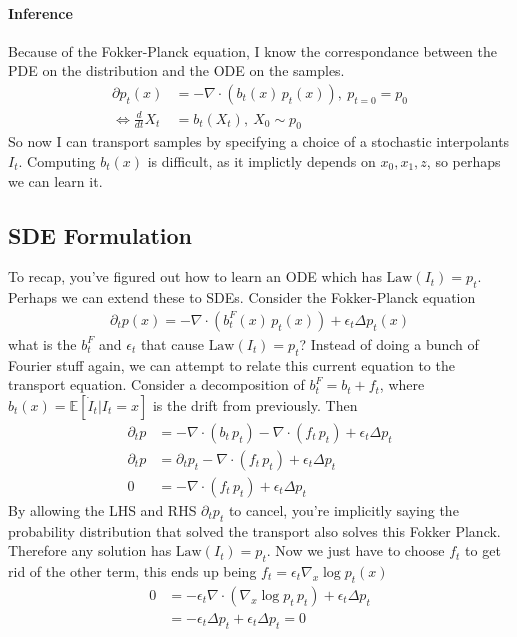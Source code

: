 \paragraph{Inference}
Because of the Fokker-Planck equation, I know the correspondance between the PDE on the distribution and the ODE on the samples.
\begin{align}
	\partial p_t (x) & = - \nabla \cdot (b_t(x) \, p_t(x)),  \ p_{t=0} = p_0\\
	\iff \frac{d}{dt}X_t & = b_t(X_t), \ X_0 \sim p_0 \label{ode}
\end{align} 
So now I can transport samples by specifying a choice of a stochastic interpolants $I_t$. Computing $b_t(x)$ is difficult, as it implictly depends on $x_0,x_1,z$, so perhaps we can learn it.

\subsection{SDE Formulation}
To recap, you've figured out how to learn an ODE which has $\text{Law}(I_t) = p_t$. Perhaps we can extend these to SDEs. Consider the Fokker-Planck equation
\begin{align}
	\partial_t p(x) = - \nabla \cdot (b^F_t(x) \, p_t(x)) + \epsilon_t \Delta p_t(x)
\end{align}
what is the $b_t^F$ and $\epsilon_t$ that cause $\text{Law}(I_t) = p_t$? Instead of doing a bunch of Fourier stuff again, we can attempt to relate this current equation to the transport equation. Consider a decomposition of $b_t^F = b_t + f_t$, where $b_t(x) = \mathbb E[\dot I_t | I_t = x]$ is the drift from previously. Then
\begin{align}
	\partial_t p & = - \nabla \cdot (b_t \, p_t)  - \nabla \cdot (f_t \, p_t) + \epsilon_t \Delta p_t\\
	\partial_t p & = \partial_t p_t - \nabla \cdot (f_t \, p_t) + \epsilon_t \Delta p_t\\
	0 & = - \nabla \cdot (f_t \, p_t) + \epsilon_t \Delta p_t
\end{align}
By allowing the LHS and RHS $\partial_t p_t$ to cancel, you're implicitly saying the probability distribution that solved the transport also solves this Fokker Planck. Therefore any solution has $\text{Law}(I_t) = p_t$. Now we just have to choose $f_t$ to get rid of the other term, this ends up being $f_t = \epsilon_t \nabla_x \log p_t(x)$
\begin{align}
	0 & = -\epsilon_t \nabla \cdot(\nabla_x \log p_t \, p_t) + \epsilon_t \Delta p_t\\
	& = - \epsilon_t \Delta p_t + \epsilon_t \Delta p_t = 0
\end{align}
